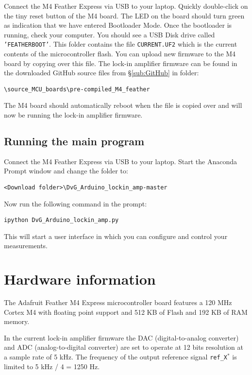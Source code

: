 \documentclass{article}
\newcommand{\code}[1]{\mbox{\texttt{#1}}}
\newcommand{\refXs}{\code{ref\_X$^*$}}
\begin{document}
\bigskip\noindent
Connect the M4 Feather Express via USB to your laptop. Quickly double-click on the tiny reset button of the M4 board. The LED on the board should turn green as indication that we have entered Bootloader Mode. Once the bootloader is running, check your computer. You should see a USB Disk drive called \code{'FEATHERBOOT'}. This folder contains the file \code{CURRENT.UF2} which is the current contents of the microcontroller flash. You can upload new firmware to the M4 board by copying over this file. The lock-in amplifier firmware can be found in the downloaded GitHub source files from \S \ref{sub:GitHub} in folder:
\begin{verbatim}
\source_MCU_boards\pre-compiled_M4_feather
\end{verbatim}
The M4 board should automatically reboot when the file is copied over and will now be running the lock-in amplifier firmware.

\subsection{Running the main program}
Connect the M4 Feather Express via USB to your laptop. Start the Anaconda Prompt window and change the folder to: \begin{verbatim}
<Download folder>\DvG_Arduino_lockin_amp-master
\end{verbatim}

\bigskip\noindent
Now run the following command in the prompt:
\begin{verbatim}
ipython DvG_Arduino_lockin_amp.py
\end{verbatim}

\noindent
This will start a user interface in which you can configure and control your measurements.

%
%

\newpage
\section{Hardware information}
The Adafruit Feather M4 Express microcontroller board features a 120 MHz Cortex M4 with floating point support and 512 KB of Flash and 192 KB of RAM memory.

In the current lock-in amplifier firmware the DAC (digital-to-analog converter) and ADC (analog-to-digital converter) are set to operate at 12 bits resolution at a sample rate of 5 kHz. The frequency of the output reference signal \refXs{} is limited to 5 kHz / 4 = 1250 Hz.
\end{document}
